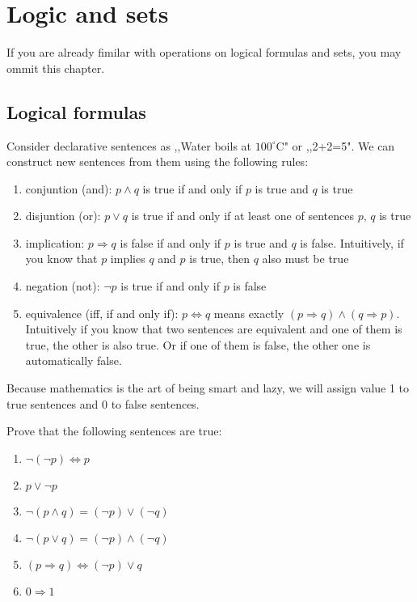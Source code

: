 
\chapter{Logic and sets}
\label{logic_and_sets} %

If you are already fimilar with operations on logical formulas and sets, you may ommit this chapter.

\section{Logical formulas}
\label{sec:logic}
	Consider declarative sentences as ,,Water boils at $100^\circ$C" or ,,2+2=5". We can construct new sentences from them using the following rules:
	\begin{enumerate}
		\item conjuntion (and): $p \wedge q$ is true if and only if $p$ is true and $q$ is true
		\item disjuntion (or): $p \vee q$ is true if and only if at least one of sentences $p,\, q$ is true
		\item implication: $p \Rightarrow q$ is false if and only if $p$ is true and $q$ is false. Intuitively,
			if you know that $p$ implies $q$ and $p$ is true, then $q$ also must be true
		\item negation (not): $\neg p$ is true if and only if $p$ is false
		\item equivalence (iff, if and only if): $p\Leftrightarrow q$ means exactly
			$(p\Rightarrow q)\wedge(q\Rightarrow p)$. Intuitively if you know that two sentences are equivalent
			and one of them is true, the other is also true. Or if one of them is false, the other one is automatically false.
	\end{enumerate}

\noindent Because mathematics is the art of being smart and lazy, we will assign value 1 to true sentences and 0 to
false sentences.

\begin{prob}
Prove that the following sentences are true:
	\begin{enumerate}
		\item $\neg(\neg p) \Leftrightarrow p$
		\item $p\vee \neg p$
		\item $\neg (p\wedge q) = (\neg p)\vee (\neg q)$
		\item $\neg (p\vee q) = (\neg p)\wedge (\neg q)$
		\item $(p\Rightarrow q)\Leftrightarrow (\neg p) \vee q$
		\item $0\Rightarrow 1$
	\end{enumerate}
\end{prob}

